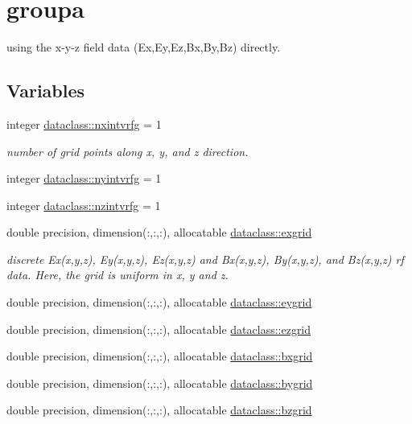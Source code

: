 \hypertarget{group__name}{}\section{groupa}
\label{group__name}


using the x-\/y-\/z field data (Ex,Ey,Ez,Bx,By,Bz) directly.  


\subsection*{Variables}
\begin{DoxyCompactItemize}
\item 
integer \mbox{\hyperlink{group__name_ga6302bc97206196f7003db67abd75507e}{dataclass\+::nxintvrfg}} = 1
\begin{DoxyCompactList}\small\item\em number of grid points along x, y, and z direction. \end{DoxyCompactList}\item 
integer \mbox{\hyperlink{group__name_ga32c01f4c7d58343edc8d318b2e5f4760}{dataclass\+::nyintvrfg}} = 1
\item 
integer \mbox{\hyperlink{group__name_ga53f757bd562f34f7e8e6bb58606fc289}{dataclass\+::nzintvrfg}} = 1
\item 
double precision, dimension(\+:,\+:,\+:), allocatable \mbox{\hyperlink{group__name_ga3379b2d98107a6908aabb71e53031c00}{dataclass\+::exgrid}}
\begin{DoxyCompactList}\small\item\em discrete Ex(x,y,z), Ey(x,y,z), Ez(x,y,z) and Bx(x,y,z), By(x,y,z), and Bz(x,y,z) rf data. Here, the grid is uniform in x, y and z. \end{DoxyCompactList}\item 
double precision, dimension(\+:,\+:,\+:), allocatable \mbox{\hyperlink{group__name_ga85c21f161fb74970fc84639092c193dd}{dataclass\+::eygrid}}
\item 
double precision, dimension(\+:,\+:,\+:), allocatable \mbox{\hyperlink{group__name_gaff9491f2e1258faccd2530eace979c78}{dataclass\+::ezgrid}}
\item 
double precision, dimension(\+:,\+:,\+:), allocatable \mbox{\hyperlink{group__name_gad10657f6c8e764ba3c355bd0e2c98a01}{dataclass\+::bxgrid}}
\item 
double precision, dimension(\+:,\+:,\+:), allocatable \mbox{\hyperlink{group__name_gaa12722da71ea440ed769b715936c87a3}{dataclass\+::bygrid}}
\item 
double precision, dimension(\+:,\+:,\+:), allocatable \mbox{\hyperlink{group__name_gaabd84b55c65371356291620ee4dceb06}{dataclass\+::bzgrid}}
\end{DoxyCompactItemize}
